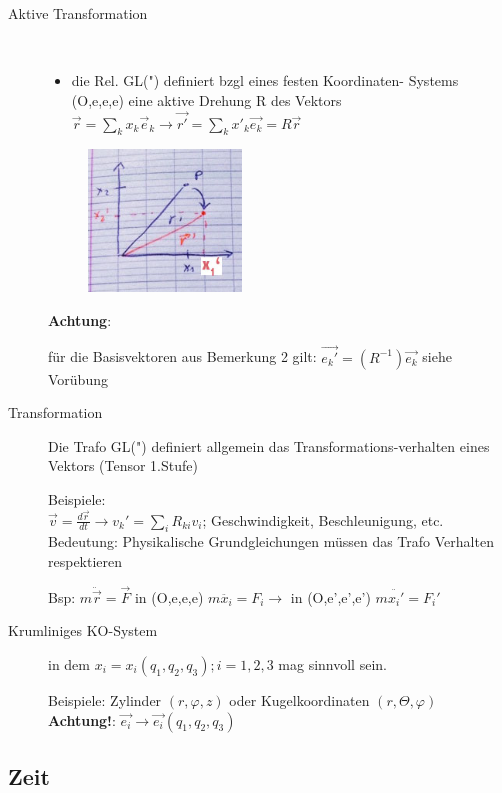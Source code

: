 \begin{description}
\item[Aktive Transformation]~\par
\begin{itemize}
\item die Rel. GL(") definiert bzgl eines festen Koordinaten- Systems (O,e,e,e) eine aktive Drehung R des Vektors $\vec{r}=\sum_k x_k\vec{e}_k \rightarrow \vec{r'}=\sum_k x'_k\vec{e_k}=R\vec{r}$
\end{itemize}
\begin{figure}[h]
\begin{center}
\includegraphics[width=0.4\textwidth]{Skizzen/Anhang11.jpg}
\end{center}
\caption{}
\end{figure}
\textbf{Achtung}:

für die Basisvektoren aus Bemerkung 2 gilt: $\vec{e_k'}=(R^{-1})\vec{e_k}$ siehe Vorübung
\item[Transformation] Die Trafo GL(") definiert allgemein das Transformations-verhalten eines Vektors (Tensor 1.Stufe)

Beispiele:\\
$\vec{v}=\frac{d\vec{r}}{dt} \rightarrow v_k'=\sum_iR_{ki}v_i$; Geschwindigkeit, Beschleunigung, etc.\\
Bedeutung: Physikalische Grundgleichungen müssen das Trafo Verhalten respektieren

Bsp: $m\ddot{\vec{r}}=\vec{F}$ in (O,e,e,e) $m\ddot{x_i}=F_i \rightarrow$ in (O,e',e',e') $m\ddot{x_i'}=F_i'$
\item[Krumliniges KO-System] in dem $x_i=x_i(q_1,q_2,q_3); i=1,2,3$ mag sinnvoll sein.

Beispiele: Zylinder $(r, \varphi, z)$ oder Kugelkoordinaten $(r, \Theta, \varphi)$\\
\textbf{Achtung!}: $\vec{e_i}\rightarrow\vec{e_i}(q_1,q_2,q_3)$
\end{description}
\newpage
\subsection{Zeit}
